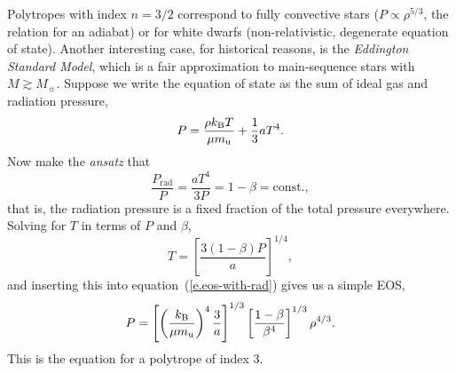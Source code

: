 Polytropes with index $n=3/2$ correspond to fully convective stars ($P \propto \rho^{5/3}$, the relation for an adiabat) or for white dwarfs (non-relativistic, degenerate equation of state). Another interesting case, for historical reasons, is the \emph{Eddington Standard Model}, which is a fair approximation to main-sequence stars with $M \gtrsim M_{\sun}$.  Suppose we write the equation of state as the sum of ideal gas and radiation pressure,
\begin{equation}\label{e.eos-with-rad}
 P  = \frac{\rho k_\mathrm{B} T}{\mu m_\mathrm{u}} + \frac{1}{3}a T^{4}.
\end{equation}
Now make the \emph{ansatz} that
\begin{equation}\label{e.beta-def}
\frac{P_{\mathrm{rad}}}{P} = \frac{aT^{4}}{3P} = 1-\beta = \mathrm{const.},
\end{equation}
that is, the radiation pressure is a fixed fraction of the total pressure everywhere.
Solving for $T$ in terms of $P$ and $\beta$,
\[ T = \left[\frac{3(1-\beta) P}{a}\right]^{1/4}, \]
and inserting this into equation~(\ref{e.eos-with-rad}) gives us a simple EOS,
\begin{equation}\label{e.beta-eos}
P = \left[\left(\frac{k_\mathrm{B}}{\mu m_\mathrm{u}}\right)^{4}\frac{3}{a}\right]^{1/3}\left[\frac{1-\beta}{\beta^{4}}\right]^{1/3} \rho^{4/3}.
\end{equation}
This is the equation for a polytrope of index 3.

